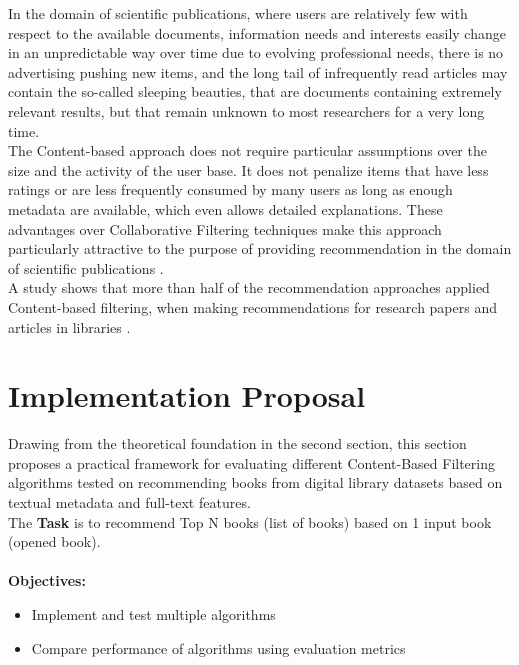 \documentclass[\myFontSize,oneside,english,hidelinks,a4paper]{article}
\begin{document}
%
%
%
In the domain of scientific publications, where users are relatively few with respect to the available documents, information needs and interests easily change in an unpredictable way over time due to evolving professional needs, there is no advertising pushing new items, and the long tail of infrequently read articles may contain the so-called sleeping beauties, that are documents containing extremely relevant results, but that remain unknown to most researchers for a very long time. \\
The Content-based approach does not require particular assumptions over the size and the activity of the user base. It does not penalize items that have less ratings or are less frequently consumed by many users as long as enough metadata are available, which even allows detailed explanations. These advantages over Collaborative Filtering techniques make this approach particularly attractive to the purpose of providing recommendation in the domain of scientific publications \cite{De_Nart201484}. \\
%
A study shows that more than half of the recommendation approaches applied Content-based filtering, when making recommendations for research papers and articles in libraries \cite{Beel2016305}. \\
%







\clearpage
\section{Implementation Proposal}
Drawing from the theoretical foundation in the second section, this section proposes a practical framework for evaluating different Content-Based Filtering algorithms tested on recommending books from digital library datasets based on textual metadata and full-text features.\\ 
The \textbf{Task} is to recommend Top N books (list of books) based on 1 input book (opened book).\\\\
\textbf{Objectives:} 
\begin{itemize}
\item Implement and test multiple algorithms
\item Compare performance of algorithms using evaluation metrics
\end{itemize}
%
%
\end{document}
